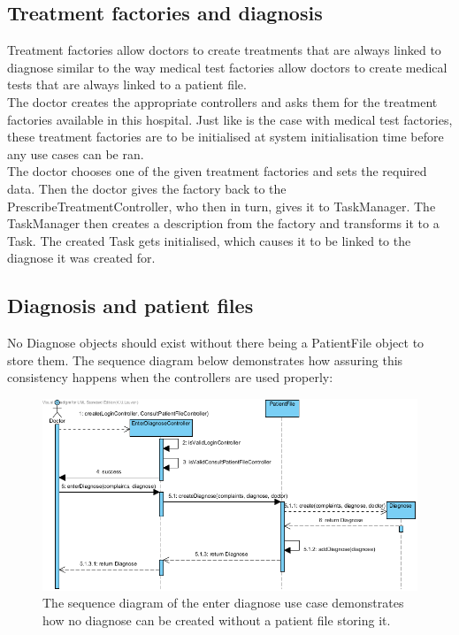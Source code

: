\documentclass[12pt]{article}
\begin{document}
\subsection{Treatment factories and diagnosis}
Treatment factories allow doctors to create treatments that are always linked to diagnose similar to the way medical test factories allow doctors to create medical tests that are always linked to a patient file.\\
The doctor creates the appropriate controllers and asks them for the treatment factories available in this hospital. Just like is the case with medical test factories, these treatment factories are to be initialised at system initialisation time before any use cases can be ran.\\
The doctor chooses one of the given treatment factories and sets the required data. Then the doctor gives the factory back to the PrescribeTreatmentController, who then in turn, gives it to TaskManager. The TaskManager then creates a description from the factory and transforms it to a Task. The created Task gets initialised, which causes it to be linked to the diagnose it was created for.
\subsection{Diagnosis and patient files}
No Diagnose objects should exist without there being a PatientFile object to store them. The sequence diagram below demonstrates how assuring this consistency happens when the controllers are used properly:

\begin{figure}[h!]
\includegraphics[width=170mm]{enterdiagnose.png}
\caption{The sequence diagram of the enter diagnose use case demonstrates how no diagnose can be created without a patient file storing it.}
\label{enterdiagnose}
\end{figure}
\end{document}
